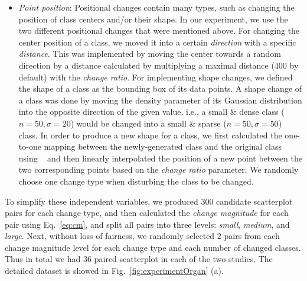 {\begin{itemize}
     \item \emph{Point position}: Positional changes contain many types, such as changing the position of class centers and/or their shape. In our experiment, we use the two different positional changes that were mentioned above. For changing the center position of a class, we  moved it into a certain \emph{direction} with a specific \emph{distance}.  This was implemented by moving the center towards a random direction by a distance calculated by multiplying a maximal distance ($400$ by default) with the \emph{change ratio}. For implementing shape changes, we defined the shape of a class as the bounding box of its data points. A shape change of a class was done by moving the density parameter of its Gaussian distribution into the opposite direction of the given value, i.e., a small \& dense class ($n=50, \sigma=20$) would be changed into a small \& sparse ($n=50, \sigma=50$) class. In order to produce a new shape for a class, we first calculated the one-to-one mapping between the newly-generated class and the original class using ~\cite{kuhn1955hungarian} and then linearly interpolated the position of a new point between the two corresponding points based on the \emph{change ratio} parameter. We randomly choose one change type when disturbing the class to be changed.
\end{itemize}
To simplify these independent variables, we produced 300 candidate scatterplot pairs for each change type, and then calculated the \emph{change magnitude} for each pair using Eq.~\ref{eq:cm}, and split all  pairs into three levels: \emph{small}, \emph{medium}, and \emph{large}.
Next, without loss of fairness, we randomly selected $2$ pairs from each change magnitude level for each change type and each number of changed classes. Thus in total we had $36$ paired scatterplot in each of the two studies. The detailed dataset is showed in Fig.~\ref{fig:experimentOrgan} (a).%

}
